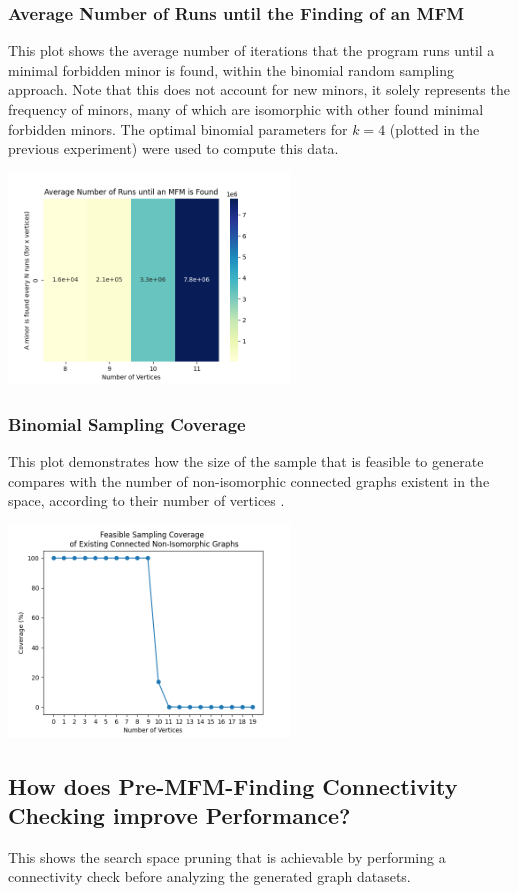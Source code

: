 \subsubsection{Average Number of Runs until the Finding of an MFM}
This plot shows the average number of iterations that the program runs until a minimal forbidden minor is found, within the binomial random sampling approach. Note that this does not account for new minors, it solely represents the frequency of minors, many of which are isomorphic with other found minimal forbidden minors. The optimal binomial parameters for $k=4$ (plotted in the previous experiment) were used to compute this data.

\includegraphics[width=7.5cm]{images/avg_runs_until_minor.png}

\subsubsection{Binomial Sampling Coverage}
This plot demonstrates how the size of the sample that is feasible to generate compares with the number of non-isomorphic connected graphs existent in the space, according to their number of vertices \cite{oeisA001349}.

\includegraphics[width=7.5cm]{images/sampling_cover.png}

\subsection{How does Pre-MFM-Finding Connectivity Checking improve Performance?}
This shows the search space pruning that is achievable by performing a connectivity check before analyzing the generated graph datasets.

